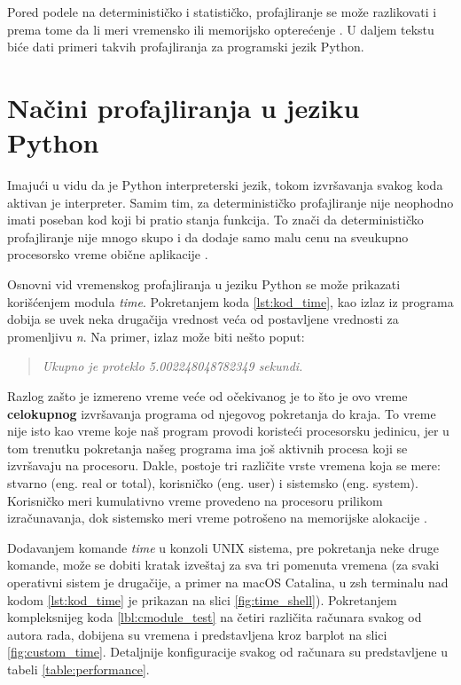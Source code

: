 \documentclass[a4paper]{article}
\begin{document}
Pored podele na determinističko i statističko, profajliranje se može razlikovati i prema tome da li meri vremensko ili memorijsko opterećenje \cite{lanaro2013python}. U daljem tekstu biće dati primeri takvih profajliranja za programski jezik Python. 

\section{Načini profajliranja u jeziku Python}
Imajući u vidu da je Python interpreterski jezik, tokom izvršavanja svakog koda aktivan je interpreter. Samim tim, za determinističko profajliranje nije neophodno imati poseban kod koji bi pratio stanja funkcija. To znači da determinističko profajliranje nije mnogo skupo i da dodaje samo malu cenu na sveukupno procesorsko vreme obične aplikacije
\cite{cProfile}.

\label{sec:profajleri_u_pythonu}
Osnovni vid vremenskog profajliranja u jeziku Python se može prikazati korišćenjem modula {\em time}. Pokretanjem koda \ref{lst:kod_time}, kao izlaz iz programa dobija se uvek neka drugačija vrednost veća od postavljene vrednosti za promenljivu {\em n}. Na primer, izlaz može biti nešto poput:

\begin{quote}
    {\em Ukupno je proteklo 5.002248048782349 sekundi.}
\end{quote}
Razlog zašto je izmereno vreme veće od očekivanog je to što je ovo vreme \textbf{celokupnog} izvršavanja programa od njegovog pokretanja do kraja. To vreme nije isto kao vreme koje naš program provodi koristeći procesorsku jedinicu, jer u tom trenutku pokretanja našeg programa ima još aktivnih procesa koji se izvršavaju na procesoru. Dakle, postoje tri različite vrste vremena koja se mere: stvarno (eng. real or total), korisničko (eng. user) i sistemsko (eng. system). Korisničko meri kumulativno vreme provedeno na procesoru prilikom izračunavanja, dok sistemsko meri vreme potrošeno na memorijske alokacije \cite{lanaro2013python}.

Dodavanjem komande {\em time} u konzoli UNIX sistema, pre pokretanja neke druge komande, može se dobiti kratak izveštaj za sva tri pomenuta vremena (za svaki operativni sistem je drugačije, a primer na macOS Catalina, u zsh terminalu nad kodom \ref{lst:kod_time} je prikazan na slici \ref{fig:time_shell}). Pokretanjem kompleksnijeg koda \ref{lbl:cmodule_test} na četiri različita računara svakog od autora rada, dobijena su vremena i predstavljena kroz barplot na slici \ref{fig:custom_time}. Detaljnije konfiguracije svakog od računara su predstavljene u tabeli \ref{table:performance}.
\end{document}
